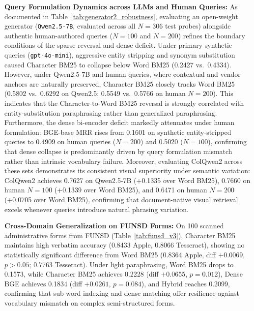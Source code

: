\textbf{Query Formulation Dynamics across LLMs and Human Queries:} As documented in Table~\ref{tab:generator2_robustness}, evaluating an open-weight generator (\texttt{Qwen2.5-7B}, evaluated across all $N=306$ test probes) alongside authentic human-authored queries ($N=100$ and $N=200$) refines the boundary conditions of the sparse reversal and dense deficit. Under primary synthetic queries (\texttt{gpt-4o-mini}), aggressive entity stripping and synonym substitution caused Character BM25 to collapse below Word BM25 (0.2427 vs.\ 0.4334). However, under Qwen2.5-7B and human queries, where contextual and vendor anchors are naturally preserved, Character BM25 closely tracks Word BM25 (0.5802 vs.\ 0.6292 on Qwen2.5; 0.5549 vs.\ 0.5766 on human $N=200$). This indicates that the Character-to-Word BM25 reversal is strongly correlated with entity-substitution paraphrasing rather than generalized paraphrasing. Furthermore, the dense bi-encoder deficit markedly attenuates under human formulation: BGE-base MRR rises from 0.1601 on synthetic entity-stripped queries to 0.4909 on human queries ($N=200$) and 0.5020 ($N=100$), confirming that dense collapse is predominantly driven by query formulation mismatch rather than intrinsic vocabulary failure. Moreover, evaluating ColQwen2 across these sets demonstrates its consistent visual superiority under semantic variation: ColQwen2 achieves 0.7627 on Qwen2.5-7B (+0.1335 over Word BM25), 0.7660 on human $N=100$ (+0.1339 over Word BM25), and 0.6471 on human $N=200$ (+0.0705 over Word BM25), confirming that document-native visual retrieval excels whenever queries introduce natural phrasing variation.

\textbf{Cross-Domain Generalization on FUNSD Forms:} On 100 scanned administrative forms from FUNSD \cite{jaume2019funsd} (Table~\ref{tab:funsd_v3}), Character BM25 maintains high verbatim accuracy (0.8433 Apple, 0.8066 Tesseract), showing no statistically significant difference from Word BM25 (0.8364 Apple, diff $+0.0069$, $p > 0.05$; 0.7763 Tesseract). Under light paraphrasing, Word BM25 drops to 0.1573, while Character BM25 achieves 0.2228 (diff $+0.0655$, $p = 0.012$), Dense BGE achieves 0.1834 (diff $+0.0261$, $p = 0.084$), and Hybrid reaches 0.2099, confirming that sub-word indexing and dense matching offer resilience against vocabulary mismatch on complex semi-structured forms.

